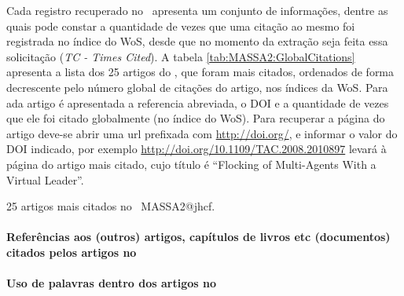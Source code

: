 Cada registro recuperado no \dataset\ apresenta um conjunto de informações, dentre as quais pode constar a quantidade de vezes que uma citação ao mesmo foi registrada no índice do WoS, desde que no momento da extração seja feita essa solicitação (\textit{TC - Times Cited}).
A tabela \ref{tab:MASSA2:GlobalCitations} apresenta a lista dos 25 artigos do \dataset, que foram mais citados, ordenados de forma decrescente pelo número global de citações do artigo, nos índices da WoS. Para ada artigo é apresentada a referencia abreviada, o DOI e a quantidade de vezes que ele foi citado globalmente (no índice do WoS). Para recuperar a página do artigo deve-se abrir uma url prefixada com \url{http://doi.org/}, e informar o valor do DOI indicado, por exemplo \url{http://doi.org/10.1109/TAC.2008.2010897} levará à página do artigo mais citado, cujo título é ``Flocking of Multi-Agents With a Virtual Leader''.

\begin{table}[]

    \centering
\footnotesize
{}

    \caption{25 artigos mais citados no \dataset\ MASSA2@jhcf.}
    \label{tab:MASSA2:GlobalCitations}
\end{table}


\paragraph{Referências aos (outros) artigos, capítulos de livros etc (documentos) citados pelos artigos no \dataset}

\paragraph{Uso de palavras dentro dos artigos no \dataset}
